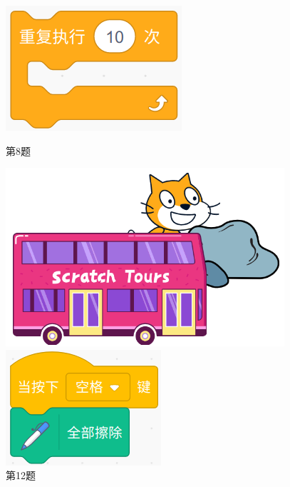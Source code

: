 \documentclass[10pt, a4paper]{article}
\begin{document}
\begin{enumerate}
\begin{figure}[htbp]
\begin{minipage}[t]{.16\textwidth}
                \includegraphics[width=\textwidth]{8.png}
                \caption*{第8题}
            \end{minipage}
            \begin{minipage}[t]{.15\textwidth}
                \centering
                \includegraphics[width=\textwidth]{12.png}
                \caption*{第12题}
            \end{minipage}
            \begin{minipage}[t]{.13\textwidth}
                \centering
                \includegraphics[width=\textwidth]{14.png}

\end{minipage}
\end{figure}
\end{enumerate}
\end{document}
